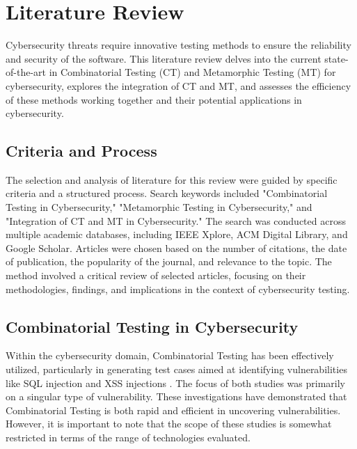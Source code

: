 
\chapter{Literature Review}
\label{ch:lr}

Cybersecurity threats require innovative testing methods to ensure the reliability and security of the software. This literature review delves into the current state-of-the-art in Combinatorial Testing (CT) and Metamorphic Testing (MT) for cybersecurity, explores the integration of CT and MT, and assesses the efficiency of these methods working together and their potential applications in cybersecurity.


\section{Criteria and Process}\label{sec:criteria-and-process}

The selection and analysis of literature for this review were guided by specific criteria and a structured process. Search keywords included "Combinatorial Testing in Cybersecurity," "Metamorphic Testing in Cybersecurity," and "Integration of CT and MT in Cybersecurity." The search was conducted across multiple academic databases, including IEEE Xplore, ACM Digital Library, and Google Scholar. Articles were chosen based on the number of citations, the date of publication, the popularity of the journal, and relevance to the topic. The method involved a critical review of selected articles, focusing on their methodologies, findings, and implications in the context of cybersecurity testing.


\section{Combinatorial Testing in Cybersecurity}\label{sec:combinatorial-testing-in-cybersecurity}

Within the cybersecurity domain, Combinatorial Testing has been effectively utilized, particularly in generating test cases aimed at identifying vulnerabilities like SQL injection \cite{Simos2019SQL} and XSS injections \cite{Garn2014XSS}. The focus of both studies was primarily on a singular type of vulnerability. These investigations have demonstrated that Combinatorial Testing is both rapid and efficient in uncovering vulnerabilities. However, it is important to note that the scope of these studies is somewhat restricted in terms of the range of technologies evaluated.


